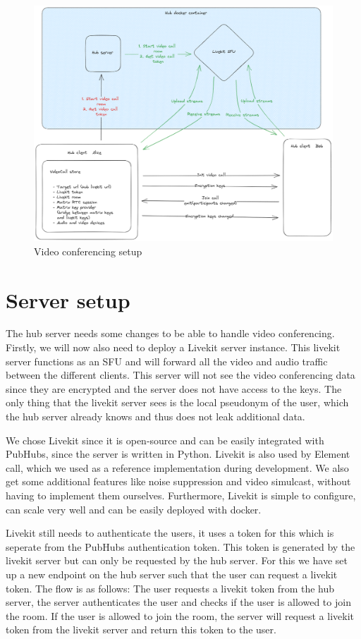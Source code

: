 \documentclass{report}
\begin{document}
\begin{figure}[!hbt]
\centering
\includegraphics[width=1\textwidth]{img/PH_videocall.excalidraw.png}
\caption{Video conferencing setup}
\label{fig:video-conference-setup}
\end{figure}


\section{Server setup}
The hub server needs some changes to be able to handle video conferencing. Firstly, we will now also need to deploy a
Livekit server instance. This livekit server functions as an SFU and will forward all the video and audio traffic
between the different clients. This server will not see the video conferencing data since they are
encrypted and the server does not have access to the keys. The only thing that the livekit server sees is the local
pseudonym of the user, which the hub server already knows and thus does not leak additional data.

We chose Livekit since it is open-source and can be easily integrated with PubHubs, since the server is written in
Python. Livekit is also used by Element call, which we used as a reference implementation during development. We
also get some additional features like noise suppression and video simulcast, without having to implement them
ourselves. Furthermore, Livekit is simple to configure, can scale very well and can be easily deployed with docker.

Livekit still needs to authenticate the users, it uses a token for this which is seperate from the PubHubs
authentication token. This token is generated by the livekit server but can only be requested by the hub server.
For this we have set up a new endpoint on the hub server such that the user can request a livekit token. The flow is
as follows: The user requests a livekit token from the hub server, the server authenticates the user and checks if
the user is allowed to join the room. If the user is allowed to join the room, the server will request a livekit
token from the livekit server and return this token to the user.
\end{document}
